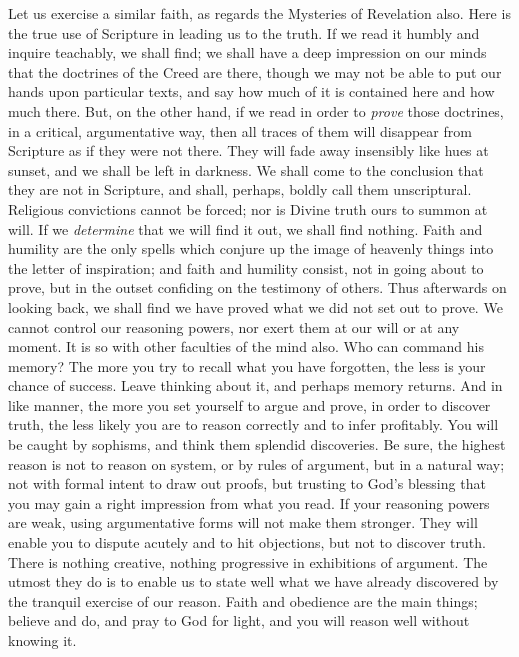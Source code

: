 Let us exercise a similar faith, as regards the Mysteries of
Revelation also. Here is the true use of Scripture in leading us to
the truth. If we read it humbly and inquire teachably, we shall find;
we shall have a deep impression on our minds that the doctrines of the
Creed are there, though we may not be able to put our hands upon
particular texts, and say how much of it is contained here and how
much there. But, on the other hand, if we read in order to \emph{prove}
those doctrines, in a critical, argumentative way, then all traces of
them will disappear from Scripture as if they were not there. They
will fade away insensibly like hues at sunset, and we shall be left in
darkness. We shall come to the conclusion that they are not in
Scripture, and shall, perhaps, boldly call them unscriptural.
Religious convictions cannot be forced; nor is Divine truth ours to
summon at will. If we \emph{determine} that we will find it out, we
shall find nothing. Faith and humility are the only spells which
conjure up the image of heavenly things into the letter of
inspiration; and faith and humility consist, not in going about to
prove, but in the outset confiding on the testimony of others. Thus
afterwards on looking back, we shall find we have proved what we did
not set out to prove. We cannot control our reasoning powers, nor
exert them at our will or at any moment. It is so with other faculties
of the mind also. Who can command his memory? The more you try to
recall what you have forgotten, the less is your chance of success.
Leave thinking about it, and perhaps memory returns. And in like
manner, the more you set yourself to argue and prove, in order to
discover truth, the less likely you are to reason correctly and to
infer profitably. You will be caught by sophisms, and think them
splendid discoveries. Be sure, the highest reason is not to reason on
system, or by rules of argument, but in a natural way; not with formal
intent to draw out proofs, but trusting to God's blessing that you may
gain a right impression from what you read. If your reasoning powers
are weak, using argumentative forms will not make them stronger. They
will enable you to dispute acutely and to hit objections, but not to
discover truth. There is nothing creative, nothing progressive in
exhibitions of argument. The utmost they do is to enable us to state
well what we have already discovered by the tranquil exercise of our
reason. Faith and obedience are the main things; believe and do, and
pray to God for light, and you will reason well without knowing it.


